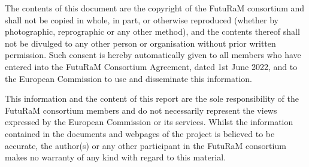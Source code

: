 
The contents of this document are the copyright of the FutuRaM consortium and shall not be copied in whole, in part, or otherwise reproduced (whether by photographic, reprographic or any other method), and the contents thereof shall not be divulged to any other person or organisation without prior written permission. Such consent is hereby automatically given to all members who have entered into the FutuRaM Consortium Agreement, dated 1st June 2022, and to the European Commission to use and disseminate this information.   

This information and the content of this report are the sole responsibility of the FutuRaM consortium members and do not necessarily represent the views expressed by the European Commission or its services. Whilst the information contained in the documents and webpages of the project is believed to be accurate, the author(s) or any other participant in the FutuRaM consortium makes no warranty of any kind with regard to this material.

